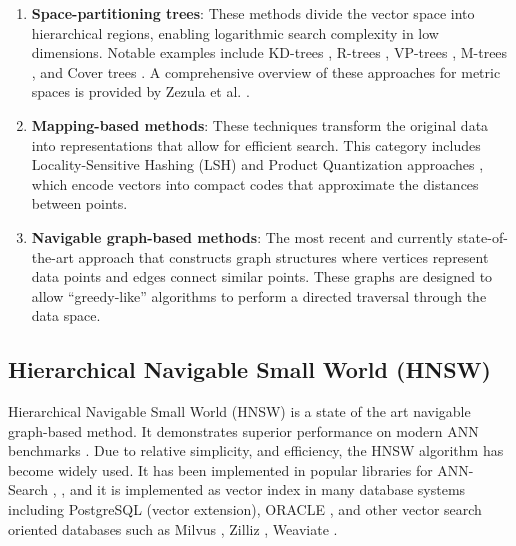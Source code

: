 \documentclass{article}
\begin{document}
\begin{enumerate}
    \item \textbf{Space-partitioning trees}: These methods divide the vector space into hierarchical regions, enabling logarithmic search complexity in low dimensions. Notable examples include KD-trees \cite{bentley1990k}, R-trees \cite{guttman1984r}, VP-trees \cite{yianilos1993}, M-trees \cite{ciaccia1997m}, and Cover trees \cite{beygelzimer2006cover}. A comprehensive overview of these approaches for metric spaces is provided by Zezula et al. \cite{zezula2006similarity}.

    \item \textbf{Mapping-based methods}: These techniques transform the original data into representations that allow for efficient search. This category includes Locality-Sensitive Hashing (LSH) \cite{Indyk1998,Gionis1999,Datar2004,Andoni2006,Andoni2015} and Product Quantization approaches \cite{Jegou2011,Ge2013,Norouzi2013}, which encode vectors into compact codes that approximate the distances between points.

    \item \textbf{Navigable graph-based methods}: The most recent and currently state-of-the-art approach that constructs graph structures where vertices represent data points and edges connect similar points. These graphs are designed to allow ``greedy-like'' algorithms to perform a directed traversal through the data space.
\end{enumerate}

\subsection{Hierarchical Navigable Small World (HNSW)}

Hierarchical Navigable Small World (HNSW) \cite{hnsw} is a state of the art navigable graph-based method. It demonstrates superior performance on modern ANN benchmarks \cite{aumuller2020ann}. Due to relative simplicity, and efficiency, the HNSW algorithm has become widely used. It has been implemented in popular libraries for ANN-Search \cite{faiss}, \cite{nmspacelib}, and it is implemented as vector index in many database systems including PostgreSQL (vector extension), ORACLE \cite{OracleHNSW2023}, and other vector search oriented databases such as Milvus \cite{MilvusHNSW2024}, Zilliz \cite{ZillizHNSW2022}, Weaviate \cite{WeaviateVectorIndex2024}.  

\end{document}
